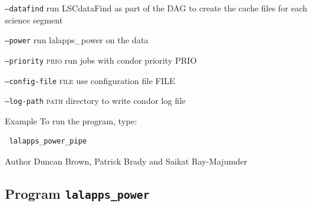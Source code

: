 \begin{entry}
\begin{entry}
\item[\texttt{--datafind}] run LSCdataFind as part of the DAG to
create the cache files for each science segment

\item[\texttt{--power}] run lalapps\_power on the data

\item[\texttt{--priority} \textsc{prio}] run jobs with condor priority PRIO

\item[\texttt{--config-file} \textsc{file}] use configuration file FILE

\item[\texttt{--log-path} \textsc{path}] directory to write condor log file
\end{entry}


\item[Example]
To run the program,  type:
\begin{verbatim}
 lalapps_power_pipe 
\end{verbatim}

\item[Author]
Duncan Brown, Patrick Brady and Saikat Ray-Majumder
\end{entry}
\clearpage


\clearpage
\subsection{Program \texttt{lalapps\_power}}
\label{program:lalapps-power}

